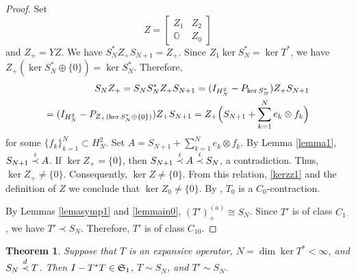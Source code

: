 \documentclass[a4paper,oneside,11pt]{amsart}
\numberwithin{equation}{section}
\theoremstyle{plain}
\newtheorem{theorem}{Theorem}[section]
\theoremstyle{definition}
\begin{document}
\begin{proof}
Set \begin{equation*} Z=\left[\begin{matrix} Z_1 & Z_2 \\ \mathbb O & Z_0\end{matrix}\right] 
\end{equation*}
and $Z_+=YZ$. 
We have $S_N^*Z_+S_{N+1}=Z_+$. 
Since $Z_1\ker S_N^*=\ker T^*$, we have $Z_+(\ker S_N^*\oplus\{0\})=\ker S_N^*$. 
Therefore, 
\begin{align*}S_NZ_+=S_NS^*_NZ_+S_{N+1}=(I_{H^2_N}-P_{\ker S_N^*})Z_+S_{N+1}\\=
(I_{H^2_N}-P_{Z_+(\ker S_N^*\oplus\{0\})})Z_+S_{N+1}=Z_+\Bigl(S_{N+1}+\sum_{k=1}^N e_k\otimes f_k\Bigr)
\end{align*}
for some $\{f_k\}_{k=1}^N\subset H^2_N$. 
Set $A=S_{N+1}+\sum_{k=1}^N e_k\otimes f_k$. 
By Lemma \ref{lemma1}, $S_{N+1}\buildrel i\over\prec A$. If $\ker Z_+=\{0\}$, then 
$S_{N+1}\buildrel i\over\prec A\buildrel i\over\prec S_N$, a contradiction. Thus,  $\ker Z_+\neq\{0\}$. Consequently, 
$\ker Z\neq\{0\}$.  
 From this relation, \eqref{kerzz1} and the definition of $Z$ we conclude that $\ker Z_0\neq\{0\}$. 
By {\cite[Introduction]{takshiftindex}},  $T_0$ is a $C_0$-contraction. 

By Lemmas \ref{lemasymp1} and \ref{lemmain0},  $(T')_+^{(a)}\cong S_N$. Since $T'$ is of class $C_{1\cdot}$, we have $T'\prec S_N$.  Therefore, 
$T'$ is of class $C_{10}$.  
\end{proof}

\begin{theorem}\label{thmmain0} Suppose that  $T$ is an expansive operator,   $N=\dim\ker T^*<\infty$, and
 $S_N\buildrel d\over\prec T$.
 Then  $I-T^*T\in\frak S_1$, $T\sim S_N$, and $T'\sim S_N$.  
\end{theorem}  
\end{document}
